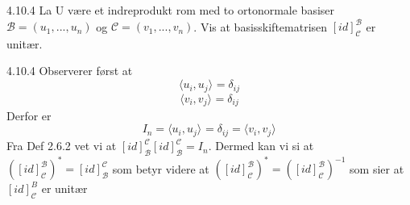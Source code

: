 \documentclass[a4paper,norsk]{article}
\begin{document}
\begin{oppgavebox}{4.10.4}{}
La U være et indreprodukt rom med to ortonormale basiser $ \mathcal{B} = \left( u_1, ..., u_n \right)  $ og $ \mathcal{C} = \left( v_1, ..., v_n \right)  $. Vis at basisskiftematrisen $ \left[ id \right] _{ \mathcal{C}}^{ \mathcal{B}} $ er unitær.


\begin{proofbox}{4.10.4}{}
    Observerer først at 
    \[
        \langle u_i, u_j \rangle_{  } = \delta_{ij} 
    \] \[
        \langle v_i, v_j \rangle_{  } = \delta_{ij}
    \]
    Derfor er 
    \[
        I_n = \langle u_i, u_j \rangle_{  } = \delta_{ij} = \langle v_i, v_j \rangle_{  }
    \]
    Fra Def 2.6.2 vet vi at $ \left[ id \right] _{ \mathcal{B}}^{ \mathcal{C}} \left[ id \right] _{ \mathcal{B}}^{ \mathcal{C}} = I_n $. Dermed kan vi si at $ \left( \left[ id \right] _{ \mathcal{C}}^{ \mathcal{B}} \right)^* = \left[ id \right] _{ \mathcal{B}}^{ \mathcal{C}}  $  som betyr videre at $ \left( \left[ id \right] _{ \mathcal{C}}^{ \mathcal{B}} \right)^* = \left( \left[ id \right] _{ \mathcal{C}}^{ \mathcal{B}} \right)^{-1} $ som sier at $ \left[ id \right] _{ \mathcal{C}}^{ B} $ er unitær
\end{proofbox}
\end{oppgavebox}
\end{document}
